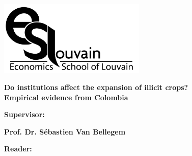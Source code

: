 \documentclass[a4paper, 12pt]{article}
\begin{document}
\thispagestyle{empty}

\begin{framed}
\begin{center}
\includegraphics[width=7cm]{./logo_ESL.pdf}

\vspace{1.5cm}
\LARGE \textbf{Do institutions affect the expansion of illicit crops?} \\
\large
\textbf{Empirical evidence from Colombia}
\end{center}
\vspace{2cm}

\hspace{4cm}
\textbf{Supervisor:}

\hspace{4cm}
\textbf{Prof. Dr. S\'{e}bastien Van Bellegem}
\vspace{0.5cm}

\hspace{4cm}
\textbf{Reader:}


\end{framed}
\end{document}
